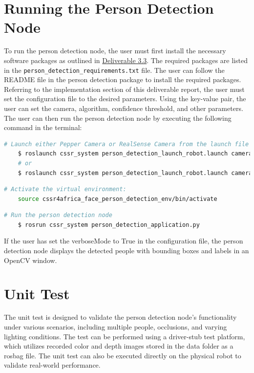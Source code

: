 \documentclass{CSSRforAfrica}
\begin{document}
\newpage

\section{Running the Person Detection Node}
To run the person detection node, the user must first install the necessary software packages as outlined in 
\href{https://cssr4africa.github.io/deliverables/CSSR4Africa_Deliverable_D3.3.pdf}{Deliverable 3.3}. The required packages
are listed in the {\scriptsize{\texttt{person\_detection\_requirements.txt}}} file. The user can follow the README file in the person detection
package to install the required packages. Referring to the implementation section of this deliverable report, the user must 
set the configuration file to the desired parameters. Using the key-value pair, the user can set the camera, algorithm, 
confidence threshold, and other parameters. The user can then run the person detection node by executing the following 
command in the terminal:

\begin{lstlisting}[style=withoutNumbering, language=bash]
	# Launch either Pepper Camera or RealSense Camera from the launch file 
	$ roslaunch cssr_system person_detection_launch_robot.launch camera:=pepper
	# or
	$ roslaunch cssr_system person_detection_launch_robot.launch camera:=realsense
\end{lstlisting}

\begin{lstlisting}[style=withoutNumbering, language=bash]
	# Activate the virtual environment:
	source cssr4africa_face_person_detection_env/bin/activate
\end{lstlisting}

\begin{lstlisting}[style=withoutNumbering, language=bash]
	# Run the person detection node
	$ rosrun cssr_system person_detection_application.py
\end{lstlisting}

If the user has set the verboseMode to True in the configuration file, the person detection node displays the detected people with bounding boxes and labels in an OpenCV window.

\newpage
\section{Unit Test}
The unit test is designed to validate the person detection node's functionality under various scenarios, including multiple people, occlusions, and varying lighting conditions. 
The test can be performed using a driver-stub test platform, which utilizes recorded color and depth images stored in the data folder as a rosbag file. The unit test can also 
be executed directly on the physical robot to validate real-world performance. 
\end{document}
